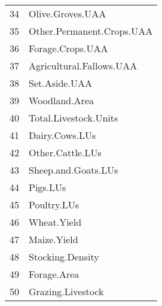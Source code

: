 \documentclass{article}\usepackage{graphicx, color}
\begin{document}
\begin{flushleft}
\begin{table}[ht]
\begin{center}
\begin{tabular}{rl}
  34 & Olive.Groves.UAA \\ 
  35 & Other.Permanent.Crops.UAA \\ 
  36 & Forage.Crops.UAA \\ 
  37 & Agricultural.Fallows.UAA \\ 
  38 & Set.Aside.UAA \\ 
  39 & Woodland.Area \\ 
  40 & Total.Livestock.Units \\ 
  41 & Dairy.Cows.LUs \\ 
  42 & Other.Cattle.LUs \\ 
  43 & Sheep.and.Goats.LUs \\ 
  44 & Pigs.LUs \\ 
  45 & Poultry.LUs \\ 
  46 & Wheat.Yield \\ 
  47 & Maize.Yield \\ 
  48 & Stocking.Density \\ 
  49 & Forage.Area \\ 
  50 & Grazing.Livestock \\ 
   \hline
\end{tabular}
\end{center}
\end{table}



\end{flushleft}
\end{document}
